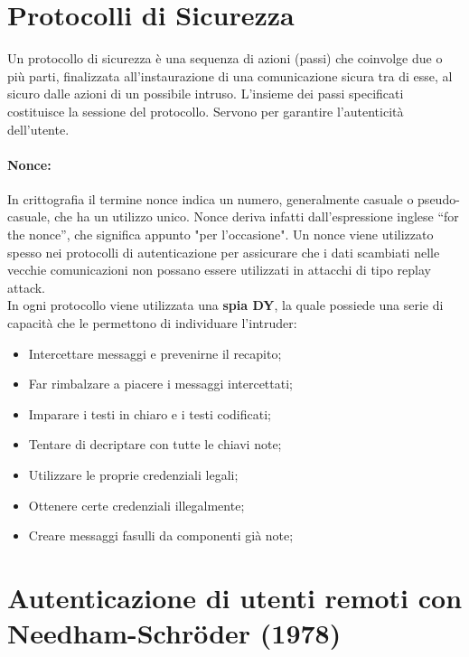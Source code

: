 \section{Protocolli di Sicurezza}

Un protocollo di sicurezza è una sequenza di azioni (passi) che
coinvolge due o più parti,
finalizzata all’instaurazione di una comunicazione sicura tra di esse, 
al sicuro dalle azioni di un
possibile intruso. L’insieme dei passi specificati costituisce la sessione 
del protocollo.
Servono per garantire l’autenticità dell’utente.

\paragraph{Nonce: }
In crittografia il termine nonce indica un numero, generalmente casuale 
o pseudo-casuale,
che ha un utilizzo unico. Nonce deriva infatti dall'espressione inglese 
“for the nonce”, che significa
appunto "per l'occasione". Un nonce viene utilizzato spesso nei protocolli 
di autenticazione per
assicurare che i dati scambiati nelle vecchie comunicazioni non possano 
essere utilizzati in
attacchi di tipo replay attack.\\

In ogni protocollo viene utilizzata una \textbf{spia DY}, la quale possiede una serie di capacità che le
permettono di individuare l’intruder:
\begin{itemize}
    \item Intercettare messaggi e prevenirne il recapito;
    \item Far rimbalzare a piacere i messaggi intercettati;
    \item Imparare i testi in chiaro e i testi codificati;
    \item Tentare di decriptare con tutte le chiavi note;
    \item Utilizzare le proprie credenziali legali;
    \item Ottenere certe credenziali illegalmente;
    \item Creare messaggi fasulli da componenti già note;
\end{itemize}

\section{Autenticazione di utenti remoti con Needham-Schr\"{o}der (1978)}

